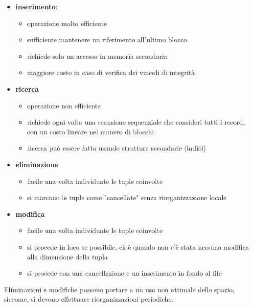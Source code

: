\begin{itemize}[label=$\Rightarrow$, itemsep=\smallskipamount]
  \item \textbf{inserimento}:
  \begin{itemize}[label=$\diamond$, itemsep=\smallskipamount]
    \item operazione molto efficiente
    \item sufficiente mantenere un riferimento all'ultimo blocco
    \item richiede solo un accesso in memoria secondaria
    \item maggiore costo in caso di verifica dei vincoli di integrità
  \end{itemize}
  \item \textbf{ricerca}
  \begin{itemize}[label=$\diamond$, itemsep=\smallskipamount]
    \item operazione non efficiente
    \item richiede ogni volta una scansione sequenziale che consideri tutti i record, con un costo lineare nel numero di blocchi
    \item ricerca può essere fatta usando strutture secondarie (indici)
  \end{itemize}
  \item \textbf{eliminazione}
  \begin{itemize}[label=$\diamond$, itemsep=\smallskipamount]
    \item  facile una volta individuate le tuple coinvolte
    \item si marcano le tuple come "cancellate" senza riorganizzazione locale
  \end{itemize}
  \item \textbf{modifica}
  \begin{itemize}[label=$\diamond$, itemsep=\smallskipamount]
    \item  facile una volta individuate le tuple coinvolte
    \item si procede in loco se possibile, cioè quando non c’è stata nessuna modifica alla dimensione della tupla
    \item si procede con una cancellazione e un inserimento in fondo al file
  \end{itemize}
\end{itemize}

Eliminazioni e modifiche possono portare a un uso non ottimale dello spazio, siccome, si devono effettuare riorganizzazioni periodiche.

